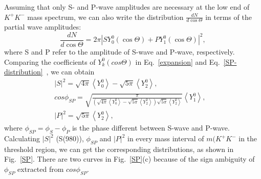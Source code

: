 \documentclass[aps,prd,twocolumn,showpacs,amsmath,amssymb]{revtex4-1}
\begin{document}
    Assuming that only S- and P-wave amplitudes are necessary at the low end of $K^{+}K^{-}$ mass spectrum, we can also write the distribution  $\frac{dN}{d\cos\Theta}$ in terms of the partial wave amplitudes:
    \begin{equation}
        \frac{dN}{d\cos\Theta} = 2\pi\left|SY_{0}^{0}(\cos\Theta) + PY_{1}^{0}(\cos\Theta)\right|^{2},\label{SP-distribution}
    \end{equation}
    where S and P refer to the amplitude of S-wave and P-wave, respectively.
    Comparing the coefficients of $Y_{k}^{0}(cos\Theta)$ in Eq.~\ref{expansion} and Eq.~\ref{SP-distribution}~\cite{PRD56-7299}, we can obtain 
    \begin{equation}
        \begin{array}{lr}
            \left|S\right|^{2} = \sqrt{4\pi}\left\langle Y_{0}^{0}\right\rangle - \sqrt{5\pi}\left\langle Y_{2}^{0}\right\rangle, &\\
            cos\phi_{SP} = \sqrt{ \frac{\pi}{ (\sqrt{4\pi}\left\langle Y_{0}^{0}\right\rangle - \sqrt{5\pi}\left\langle Y_{2}^{0}\right\rangle)\sqrt{5\pi}\left\langle Y_{2}^{0}\right\rangle  }   } \left\langle Y_{1}^{0}\right\rangle, &\\
            \left|P\right|^{2} = \sqrt{5\pi}\left\langle Y_{2}^{0}\right\rangle, &
        \end{array}\label{SP-RES} 
    \end{equation}
    where $\phi_{SP} = \phi_{S} - \phi_{P}$ is the phase different between S-wave and P-wave.
    Calculating $\left|S\right|^{2}$ (S(980)), $\phi_{SP}$ and $\left|P\right|^{2}$ in every mass interval of $m(K^{+}K^{-}$ in the threshold region, we can get the corresponding distributions,  as shown in Fig.~\ref{SP}.
    There are two curves in Fig.~\ref{SP}(c) because of the sign ambiguity of $\phi_{SP}$ extracted from $cos\phi_{SP}$.

\end{document}
